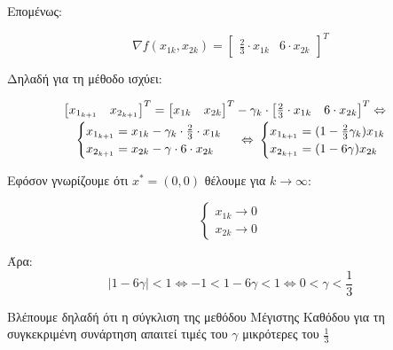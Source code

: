     Επομένως:

    $$
    \nabla f(x_{1k}, x_{2k}) = \begin{bmatrix} \frac23 \cdot x_{1k} & 6 \cdot x_{2k} \end{bmatrix}^T
    $$

    Δηλαδή για τη μέθοδο ισχύει:
    
    \begin{equation}\begin{multlined} 
        \begin{bmatrix} x_{1_{k + 1}} & x_{2_{k + 1}}\end{bmatrix}^T = \begin{bmatrix} x_{1k} & x_{2k}\end{bmatrix}^T - \gamma_k \cdot \begin{bmatrix} \frac23 \cdot x_{1k} & 6 \cdot x_{2k} \end{bmatrix}^T \Leftrightarrow \\
        \shoveleft \begin{cases} x_{1_{k + 1}} = x_{1k} -\gamma_k \cdot \frac23 \cdot x_{1k} \\ x_{2_{k + 1}} = x_{2k} -\gamma \cdot 6 \cdot x_{2k} \end{cases} \Leftrightarrow \begin{cases} x_{1_{k + 1}} = (1 - \frac23 \gamma_k) x_{1k} \\ x_{2_{k + 1}} = (1 -6\gamma) x_{2k} \end{cases} 
    \end{multlined}\end{equation}

    Εφόσον γνωρίζουμε ότι $x^* = (0, 0)$ θέλουμε για $k \rightarrow \infty$:

    $$
    \begin{cases}
        x_{1k} \rightarrow 0 \\ x_{2k} \rightarrow 0
    \end{cases}
    $$

    Άρα:
    \begin{equation}
        |1 - 6\gamma| < 1 \Leftrightarrow -1 < 1 - 6\gamma < 1 \Leftrightarrow 0 < \gamma < \frac13
    \end{equation}

    Βλέπουμε δηλαδή ότι η σύγκλιση της μεθόδου Μέγιστης Καθόδου για τη συγκεκριμένη συνάρτηση απαιτεί τιμές του $\gamma$ μικρότερες του $\frac13$